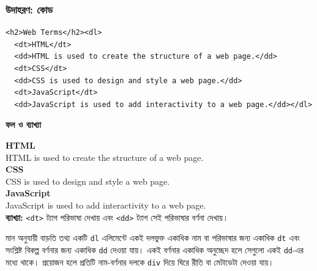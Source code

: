 \par\noindent
\begin{minipage}[t]{.54\linewidth}\vspace{0pt}\small
\subsubsection{উদাহরণ: কোড}
\begin{verbatim}
<h2>Web Terms</h2><dl>
  <dt>HTML</dt>
  <dd>HTML is used to create the structure of a web page.</dd>
  <dt>CSS</dt>
  <dd>CSS is used to design and style a web page.</dd>
  <dt>JavaScript</dt>
  <dd>JavaScript is used to add interactivity to a web page.</dd></dl>
\end{verbatim}

\par\smallskip
\end{minipage}\hfill
\begin{minipage}[t]{.42\linewidth}\vspace{0pt}\small
\textbf{\color{chFourTeal}ফল ও ব্যাখ্যা}\par
\textbf{HTML}\\
\hspace*{.5em}HTML is used to create the structure of a web page.\\
\textbf{CSS}\\
\hspace*{.5em}CSS is used to design and style a web page.\\
\textbf{JavaScript}\\
\hspace*{.5em}JavaScript is used to add interactivity to a web page.\\
\textbf{ব্যাখ্যা:} \texttt{<dt>} ট্যাগ পরিভাষা দেখায় এবং \texttt{<dd>} ট্যাগ সেই পরিভাষার বর্ণনা দেখায়।
\par\smallskip
\end{minipage}\par




\begin{keypointbox}{মান অনুযায়ী বাড়তি তথ্য}
একটি \texttt{dl} এলিমেন্টে একই দলভুক্ত একাধিক নাম বা পরিভাষার জন্য একাধিক \texttt{dt} এবং সংশ্লিষ্ট বিকল্প বর্ণনার জন্য একাধিক \texttt{dd} দেওয়া যায়। একই বর্ণনার একাধিক অনুচ্ছেদ হলে সেগুলো একই \texttt{dd}-এর মধ্যে থাকে। প্রয়োজন হলে প্রতিটি নাম-বর্ণনার দলকে \texttt{div} দিয়ে ঘিরে রীতি বা মেটাডেটা দেওয়া যায়।
\end{keypointbox}

